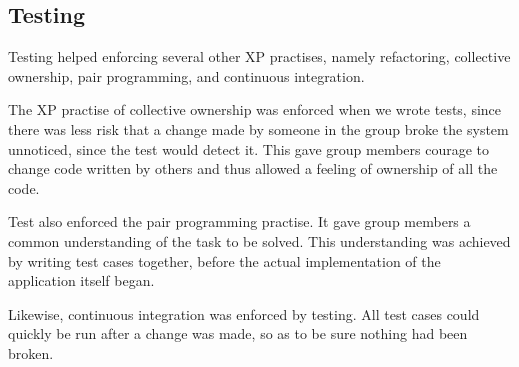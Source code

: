 \subsection{Testing}
Testing helped enforcing several other XP practises, namely refactoring, collective ownership, pair programming, and continuous integration. 

The XP practise of collective ownership was enforced when we wrote tests, since there was less risk that a change made by someone in the group broke the system unnoticed, since the test would detect it. This gave group members courage to change code written by others and thus allowed a feeling of ownership of all the code. 

Test also enforced the pair programming practise. It gave group members a common understanding of the task to be solved. This understanding was achieved by writing test cases together, before the actual implementation of the application itself began.

Likewise, continuous integration was enforced by testing. All test cases could quickly be run after a change was made, so as to be sure nothing had been broken.